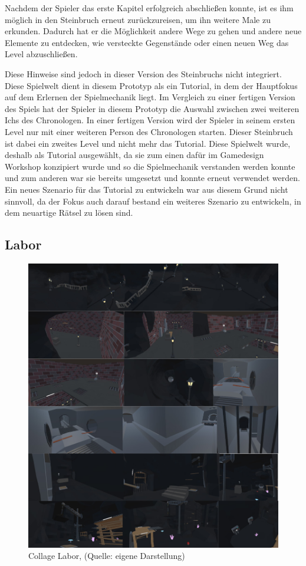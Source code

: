 Nachdem der Spieler das erste Kapitel erfolgreich abschließen konnte, ist es ihm möglich in den Steinbruch erneut zurückzureisen, um ihn weitere Male zu erkunden. Dadurch hat er die Möglichkeit andere Wege zu gehen und andere neue Elemente zu entdecken, wie  versteckte Gegenstände oder einen neuen Weg das Level abzuschließen.

Diese Hinweise sind jedoch in dieser Version des Steinbruchs nicht integriert. Diese Spielwelt dient in diesem Prototyp als ein Tutorial, in dem der Hauptfokus auf dem Erlernen der Spielmechanik liegt. Im Vergleich zu einer fertigen Version des Spiels hat der Spieler in diesem Prototyp die Auswahl zwischen zwei weiteren Ichs des Chronologen. In einer fertigen Version wird der Spieler in seinem ersten Level nur mit einer weiteren Person des Chronologen starten. Dieser Steinbruch ist dabei ein zweites Level und nicht mehr das Tutorial. Diese Spielwelt wurde, deshalb als Tutorial ausgewählt, da sie zum einen dafür im Gamedesign Workshop konzipiert wurde und so die Spielmechanik verstanden werden konnte und zum anderen war sie bereits umgesetzt und konnte erneut verwendet werden. Ein neues Szenario für das Tutorial zu entwickeln war aus diesem Grund nicht sinnvoll, da der Fokus auch darauf bestand ein weiteres Szenario zu entwickeln, in dem neuartige Rätsel zu lösen sind.

\subsection{Labor}

\begin{figure}[ht]
\centering
\includegraphics[width=1\linewidth]{content/pictures/Labor - A Fraction of Time.jpg}
\caption{Collage Labor, (Quelle: eigene Darstellung)}
\label{fig:collage_labor}
\end{figure}

